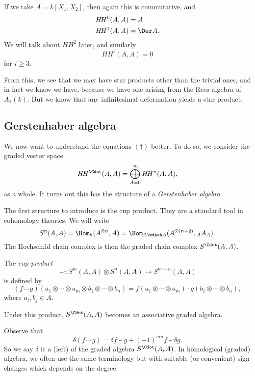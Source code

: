 \documentclass[a4paper]{article}
\newcommand\HH{H\!H}
\begin{document}
\begin{eg}
  If we take $A = k[X_1, X_2]$, then again this is commutative, and
  \begin{align*}
    \HH^0(A, A) &= A\\
    \HH^1(A, A) &= \Der A.
  \end{align*}
  We will talk about $\HH^2$ later, and similarly
  \[
    \HH^i(A, A) = 0
  \]
  for $i \geq 3$.
\end{eg}
From this, we see that we may have star products other than the trivial ones, and in fact we know we have, because we have one arising from the Rees algebra of $A_1(k)$. But we know that any infinitesimal deformation yields a star product.

\subsection{Gerstenhaber algebra}
We now want to understand the equations $(\dagger)$ better. To do so, we consider the graded vector space
\[
 \HH^\Cdot (A, A) = \bigoplus_{A = 0}^\infty \HH^n(A, A),
\]
as a whole. It turns out this has the structure of a \emph{Gerstenhaber algebra}

The first structure to introduce is the cup product. They are a standard tool in cohomology theories. We will write
\[
  S^n(A, A) = \Hom_k(A^{\otimes n}, A) = \Hom_{A\mdash A} (A^{\otimes (n + 2)}, {_AA_A}).
\]
The Hochschild chain complex is then the graded chain complex $S^{\Cdot}(A, A)$.

\begin{defi}
  The \emph{cup product}
  \[
    \smile: S^m (A, A) \otimes S^n(A, A) \to S^{m + n}(A, A)
  \]
  is defined by
  \[
    (f \smile g)(a_1 \otimes \cdots \otimes a_m \otimes b_1 \otimes \cdots \otimes b_n) = f(a_1 \otimes \cdots \otimes a_m) \cdot g(b_1 \otimes \cdots \otimes b_n),
  \]
  where $a_i, b_j \in A$.
\end{defi}
Under this product, $S^\Cdot(A, A)$ becomes an associative graded algebra.

Observe that
\[
  \delta(f \smile g) = \delta f \smile g + (-1)^{mn} f \smile \delta g.
\]
So we say $\delta$ is a (left)  of the graded algebra $S^\Cdot(A, A)$. In homological (graded) algebra, we often use the same terminology but with suitable (or convenient) sign changes which depends on the degree.
\end{document}
